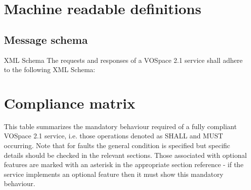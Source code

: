 \documentclass[11pt,a4paper]{ivoa}
\begin{document}
\appendix

\section{Machine readable definitions}
\label{sec:machine readable definitions}
\subsection{Message schema}
\label{subsec:message schema}
XML Schema
The requests and responses of a VOSpace 2.1 service shall adhere to the following XML Schema:



\section{Compliance matrix}
\label{sec:compliance matrix}
This table summarizes the mandatory behaviour required of a fully compliant VOSpace 2.1 service, i.e. those operations denoted as SHALL and MUST occurring. Note that for faults the general condition is specified but specific details should be checked in the relevant sections. Those associated with optional features are marked with an asterisk in the appropriate section reference - if the service implements an optional feature then it must show this mandatory behaviour.
\end{document}
